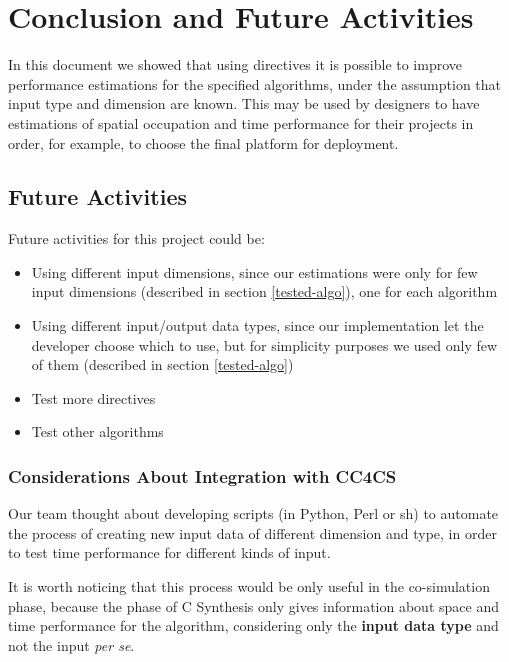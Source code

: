 \chapter{Conclusion and Future Activities}
\label{chapter:conclusion}

In this document we showed that using directives it is possible to improve performance estimations for the specified algorithms, under the assumption that input type and dimension are known. This may be used by designers to have estimations of spatial occupation and time performance for their projects in order, for example, to choose the final platform for deployment.

\section{Future Activities}

Future activities for this project could be:

\begin{itemize}[noitemsep]
	\item Using different input dimensions, since our estimations were only for few input dimensions (described in section \ref{tested-algo}), one for each algorithm
	\item Using different input/output data types, since our implementation let the developer choose which to use, but for simplicity purposes we used only few of them (described in section \ref{tested-algo})
	\item Test more directives
	\item Test other algorithms
\end{itemize}

\newpage

\subsection*{Considerations About Integration with CC4CS}

Our team thought about developing scripts (in Python, Perl or sh) to automate the process of creating new input data of different dimension and type, in order to test time performance for different kinds of input. 

It is worth noticing that this process would be only useful in the co-simulation phase, because the phase of C Synthesis only gives information about space and time performance for the algorithm, considering only the \textbf{input data type} and not the input \textit{per se}.


